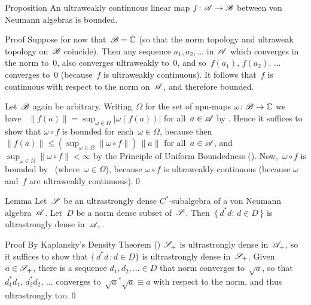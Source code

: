 \documentclass[a]{subfiles}
\begin{document}
\begin{parsec}%
\begin{point}{Proposition}%
An ultraweakly continuous linear map $f\colon \mathscr{A}\to\mathscr{B}$
between von Neumann algebras is bounded.
\begin{point}{Proof}%
Suppose for now that~$\mathscr{B}=\mathbb{C}$
(so that the norm topology and ultraweak topology on~$\mathscr{B}$ coincide).
Then any sequence $a_1,a_2,\dotsc$
in~$\mathscr{A}$ which converges in the norm to~$0$,
also converges ultraweakly to~$0$,
and so~$f(a_1),\,f(a_2),\,\dotsc$ converges
to~$0$ (because~$f$ is ultraweakly continuous).
It follows that~$f$ is continuous with respect to the norm
on~$\mathscr{A}$, and therefore bounded.
\begin{point}%
Let~$\mathscr{B}$ again be arbitrary.
Writing~$\Omega$ for the set of npu-maps $\omega\colon \mathscr{B}\to\mathbb{C}$
we have~
$\|f(a)\|=\sup_{\omega\in\Omega} \left|\omega(f(a))\right|$
for all~$a\in\mathscr{A}$
by \TODO{}.
Hence it suffices to show that $\omega\circ f$
is bounded for each~$\omega\in\Omega$,
because then $\|f(a)\|\leq (\sup_{\omega\in\Omega}\|\omega\circ f\|)\,\|a\|$
for all~$a\in \mathscr{A}$,
and~$\sup_{\omega\in \Omega} \|\omega\circ f\|<\infty$
by the Principle of Uniform Boundedness ().
Now,~$\omega\circ f$ is bounded by~ 
(where~$\omega\in\Omega$),
because $\omega\circ f$ is ultraweakly continuous
(because $\omega$ and~$f$ are ultraweakly continuous).\qed
\end{point}
\end{point}
\end{point}
\begin{point}{Lemma}%
Let~$\mathscr{S}$ be an ultrastrongly dense $C^*$-subalgebra
of a von Neumann algebra~$\mathscr{A}$.
Let~$D$ be a norm dense subset of~$\mathscr{S}$.
Then~$\{\,d^*d\colon\,d\in D\,\}$
is ultrastrongly dense in~$\mathscr{A}_{+}$.
\begin{point}{Proof}%
By Kaplansky's Density Theorem ()
$\mathscr{S}_{+}$ 
is ultrastrongly dense in~$\mathscr{A}_{+}$,
so it suffices to show that $\{\, d^*d\,\colon d\in D\}$
is ultrastrongly dense in~$\mathscr{S}_{+}$.
Given~$a\in \mathscr{S}_{+}$,
there is a sequence $d_1,d_2,\dotsc \in D$
that norm converges to~$\sqrt{a}$,
so that~$d_1^*d_1,\,d_2^*d_2,\,\dotsc$
converges to~$\sqrt{a}^*\sqrt{a}\equiv a$
with respect to the norm, and thus ultrastrongly too.\qed
\end{point}
\end{point}
\end{parsec}%
\end{document}
